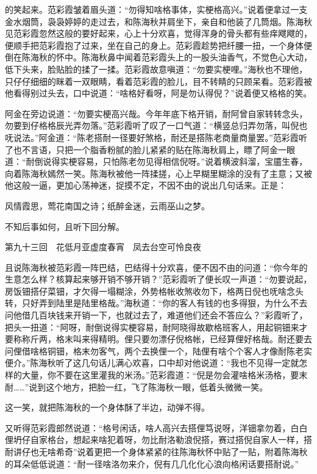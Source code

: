 \documentclass[12pt,UTF8]{ctexbook}
\begin{document}
{{{的笑起来。范彩霞皱着眉头道：“勿得知啥格事体，实梗格高兴。”说着便拿过一支金水烟筒，袅袅婷婷的走过去，和陈海秋并肩坐下，亲自和他装了几筒烟。陈海秋见范彩霞忽然这般的要好起来，心上十分欢喜，觉得浑身的骨头都有些痒飕飕的，便顺手把范彩霞抱了过来，坐在自己的身上。范彩霞趁势把纤腰一扭，一个身体便倒在陈海秋的怀中。陈海秋鼻中闻着范彩霞头上的一股头油香气，不觉色心大动，低下头来，脸贴脸的揉了一揉。范彩霞故意嗔道：“勿要实梗哩。”海秋也不理他，只仔仔细细的眯着一双眼睛，看着范彩霞的脸儿，目不转睛的只顾呆看。范彩霞被他看得别过头去，口中说道：“啥格好看呀，阿是勿认得倪？”说着便又格格的笑。

阿金在旁边说道：“勿要实梗高兴哉。今年年底下格开销，耐阿曾自家转转念头，勿要到仔格格辰光弄勿落。”范彩霞听了叹了一口气道：“横竖总归弄勿落，叫倪也呒说法。”阿金道：“陈老搭耐一径要好煞格，耐还是搭陈老商量商量罢。”范彩霞听了也不言语，只把一个脂香粉腻的脸儿紧紧的贴在陈海秋肩上，瞟了阿金一眼道：“耐倒说得实梗容易，只怕陈老勿见得相信倪呀。”说着横波斜溜，宝靥生春，向着陈海秋嫣然一笑。陈海秋被他一阵揉搓，心上早糊里糊涂的没有了主意；又被他这般一逼，更加心荡神迷，捉摸不定，不因不由的说出几句话来。正是：

风情霞思，莺花南国之诗；纸醉金迷，云雨巫山之梦。

不知后事如何，且听下回分解。





第九十三回　花低月亚虚度春宵　凤去台空可怜良夜



且说陈海秋被范彩霞一阵巴结，巴结得十分欢喜，便不因不由的问道：“你今年的生意怎么样？核算起来够开销不够开销？”范彩霞听了便长叹一声道：“勿要说起，房饭钿搭仔菜钿，才欠得一塌糊涂，外势格帐收煞收勿下，格两日倪也呒啥念头转，只好弄到陆里是陆里格哉。”海秋道：“你的客人有钱的也多得狠，为什么不去问他借几百块钱来开销一下，也就过去了，难道他们还会不答应么？”彩霞听了，把头一扭道：“阿呀，耐倒说得实梗容易，耐阿晓得故歇格班客人，用起铜钿来才要称称斤两，格末叫来得精明。俚只要勿漂仔倪格帐，已经算俚好格哉。耐还要去问俚借啥格铜钿，格末勿客气，两个去换俚一个，陆俚有啥个个客人才像耐陈老实便介。”陈海秋听了这几句话儿满心欢喜，口中却对他说道：“我也不见得一定就怎样的大量，你不要在这里灌我的米汤。”范彩霞道：“倪是勿会灌啥格米汤格，要末耐……”说到这个地方，把脸一红，飞了陈海秋一眼，低着头微微一笑。

这一笑，就把陈海秋的一个身体酥了半边，动弹不得。

又听得范彩霞郎然说道：“格号闲话，啥人高兴去搭俚笃说呀，洋钿拿勿着，白白俚坍仔自家格台，想起来啥犯着呀，勿比耐洛勒浪倪搭，赛过搭倪自家人一样，搭耐讲仔也无啥希奇”说着更把一个身体紧紧的往陈海秋怀中贴了一贴，附着陈海秋的耳朵低低说道：“耐一径啥洛勿来介，倪有几几化化心浪向格闲话要搭耐说。”

}}}
\end{document}
